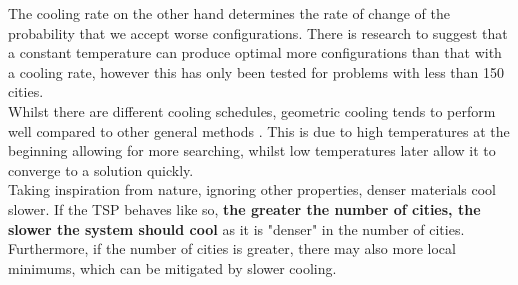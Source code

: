 \documentclass{article}
\begin{document}
The cooling rate on the other hand determines the rate of change of the probability that we accept worse configurations.
There is research \cite{fixed-temperature} to suggest that a constant temperature can produce optimal more configurations than that with a cooling rate, however this has only been tested for problems with less than 150 cities.
\\

Whilst there are different cooling schedules, geometric cooling tends to perform well compared to other general methods \cite{cooling-schedule}.
This is due to high temperatures at the beginning allowing for more searching, whilst low temperatures later allow it to converge to a solution quickly.
\\

Taking inspiration from nature, ignoring other properties, denser materials cool slower.
If the TSP behaves like so, \textbf{the greater the number of cities, the slower the system should cool} as it is "denser" in the number of cities.
Furthermore, if the number of cities is greater, there may also more local minimums, which can be mitigated by slower cooling.
\end{document}
